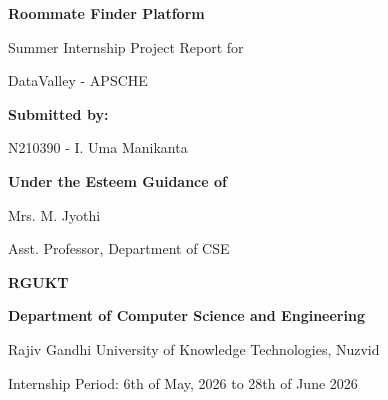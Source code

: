 \documentclass[12pt,a4paper]{report}
\begin{document}

\begin{titlepage}
    \centering
    \vspace*{1cm}
    
    {\Huge \textbf{Roommate Finder Platform} \par}
    
    \vspace{1.5cm}
    
    {\Large Summer Internship Project Report for \par}
    {\Large DataValley - APSCHE \par}
    
    \vspace{1.5cm}
    
    {\Large \textbf{Submitted by:} \par}
    \vspace{0.5cm}
    {\large N210390 - I. Uma Manikanta \par}
    
    \vspace{1.5cm}
    
    {\Large \textbf{Under the Esteem Guidance of} \par}
    {\large Mrs. M. Jyothi \par}
    {\large Asst. Professor, Department of CSE \par}
    
    \vspace{2cm}
    

    
    {\LARGE \textbf{RGUKT} \par}
    \vspace{1cm}
    
    {\large \textbf{Department of Computer Science and Engineering} \par}
    {\large Rajiv Gandhi University of Knowledge Technologies, Nuzvid \par}
    
    \vspace{0.5cm}
    {\large Internship Period: 6th of May, 2026 to 28th of June 2026 \par}
\end{titlepage}

\newpage
\thispagestyle{empty}
\mbox{}
\newpage


\end{document}
